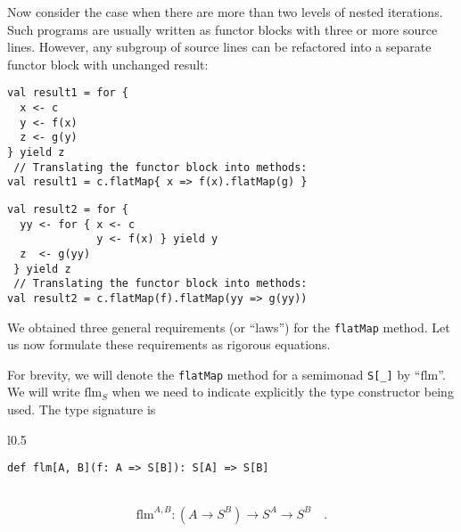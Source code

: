 Now consider the case when there are more than two levels of nested
iterations. Such programs are usually written as functor blocks with
three or more source lines. However, any subgroup of source lines
can be refactored into a separate functor block with unchanged result:

\vspace{0.3\baselineskip}

\noindent \texttt{\textcolor{blue}{\footnotesize{}}}%
\begin{minipage}[c]{0.475\columnwidth}%
\begin{lstlisting}
val result1 = for {
  x <- c
  y <- f(x)
  z <- g(y)
} yield z
 // Translating the functor block into methods:
val result1 = c.flatMap{ x => f(x).flatMap(g) }
\end{lstlisting}
%
\end{minipage}\texttt{\textcolor{blue}{\footnotesize{}\hspace*{\fill}}}%
\begin{minipage}[c]{0.475\columnwidth}%
\begin{lstlisting}
val result2 = for {
  yy <- for { x <- c
              y <- f(x) } yield y
  z  <- g(yy)
 } yield z
 // Translating the functor block into methods:
val result2 = c.flatMap(f).flatMap(yy => g(yy))
\end{lstlisting}
%
\end{minipage}\vspace{0\baselineskip}

We obtained three general requirements (or \textsf{``}laws\textsf{''}) for the \lstinline!flatMap!
method. Let us now formulate these requirements as rigorous equations.

For brevity, we will denote the \lstinline!flatMap! method for a
semimonad \lstinline!S[_]! by \textsf{``}$\text{flm}$\textsf{''}. We will write
$\text{flm}_{S}$ when we need to indicate explicitly the type constructor
being used. The type signature is

\begin{wrapfigure}{l}{0.5\columnwidth}%
\vspace{-0.9\baselineskip}

\begin{lstlisting}
def flm[A, B](f: A => S[B]): S[A] => S[B] 
\end{lstlisting}

\vspace{-0.5\baselineskip}
\end{wrapfigure}%

~\vspace{-0.5\baselineskip}
\[
\text{flm}^{A,B}:(A\rightarrow S^{B})\rightarrow S^{A}\rightarrow S^{B}\quad.
\]

